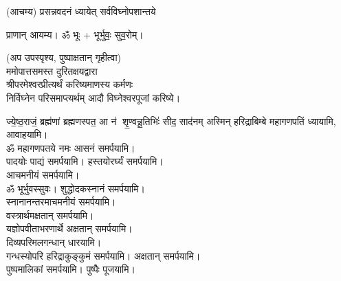 
\setlength{\parindent}{0pt}


(आचम्य)
{प्रसन्नवदनं ध्यायेत् सर्वविघ्नोपशान्तये}
 
प्राणान्  आयम्य।  ॐ भूः + भूर्भुवः॒ सुव॒रोम्।
 
(अप उपस्पृश्य, पुष्पाक्षतान् गृहीत्वा)\\
ममोपात्तसमस्त दुरितक्षयद्वारा \\
श्रीपरमेश्वरप्रीत्यर्थं करिष्यमाणस्य कर्मणः\\
 निर्विघ्नेन परिसमाप्त्यर्थम् आदौ विघ्नेश्वरपूजां करिष्ये।

{ज्ये॒ष्ठ॒राजं॒ ब्रह्म॑णां ब्रह्मणस्पत॒ आ न॑ शृ॒ण्वन्नू॒तिभिः॑ सीद॒ साद॑नम्}
अस्मिन् हरिद्राबिम्बे महागणपतिं ध्यायामि, आवाहयामि।\\


ॐ महागणपतये नमः  आसनं समर्पयामि।\\
पादयोः पाद्यं समर्पयामि। हस्तयोरर्घ्यं समर्पयामि।\\
आचमनीयं समर्पयामि।\\
ॐ भूर्भुवस्सुवः। शुद्धोदकस्नानं समर्पयामि।\\
स्नानानन्तरमाचमनीयं समर्पयामि।\\
वस्त्रार्थमक्षतान् समर्पयामि।\\
यज्ञोपवीताभरणार्थे अक्षतान् समर्पयामि।\\
दिव्यपरिमलगन्धान् धारयामि।\\
गन्धस्योपरि हरिद्राकुङ्कुमं समर्पयामि। अक्षतान् समर्पयामि। \\
पुष्पमालिकां समर्पयामि। पुष्पैः पूजयामि।

